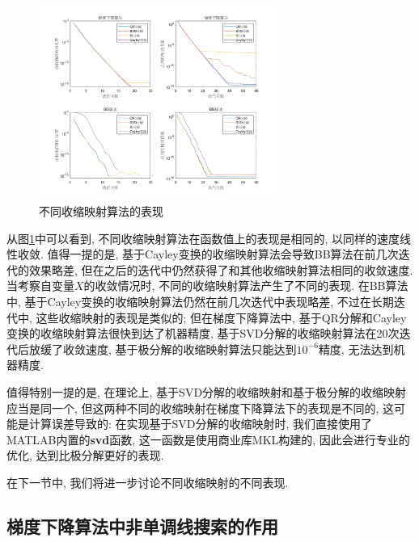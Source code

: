 \documentclass[UTF8]{ctexart}
\begin{document}
\begin{figure}[htbp]
    \centering
    \includegraphics[width=0.7\textwidth]{Q2-figure/2.png}
    \caption{不同收缩映射算法的表现}\label{fig2}
\end{figure}
从图\ref{fig2}中可以看到, 不同收缩映射算法在函数值上的表现是相同的, 以同样的速度线性收敛. 值得一提的是, 基于Cayley变换的收缩映射算法会导致BB算法在前几次迭代的效果略差, 但在之后的迭代中仍然获得了和其他收缩映射算法相同的收敛速度. 当考察自变量$X$的收敛情况时, 不同的收缩映射算法产生了不同的表现. 在BB算法中, 基于Cayley变换的收缩映射算法仍然在前几次迭代中表现略差, 不过在长期迭代中, 这些收缩映射的表现是类似的; 但在梯度下降算法中, 基于QR分解和Cayley变换的收缩映射算法很快到达了机器精度, 基于SVD分解的收缩映射算法在20次迭代后放缓了收敛速度, 基于极分解的收缩映射算法只能达到$10^{-6}$精度, 无法达到机器精度. \par
值得特别一提的是, 在理论上, 基于SVD分解的收缩映射和基于极分解的收缩映射应当是同一个, 但这两种不同的收缩映射在梯度下降算法下的表现是不同的, 这可能是计算误差导致的: 在实现基于SVD分解的收缩映射时, 我们直接使用了MATLAB内置的\textbf{svd}函数, 这一函数是使用商业库MKL构建的, 因此会进行专业的优化, 达到比极分解更好的表现. \par
在下一节中, 我们将进一步讨论不同收缩映射的不同表现. 

\subsection{梯度下降算法中非单调线搜索的作用}
\end{document}
